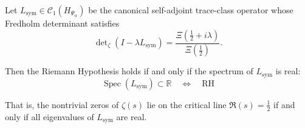 \begin{corollary}
\label{cor:spectrum_real_equiv_rh}
Let \( L_{\mathrm{sym}} \in \mathcal{C}_1(H_{\Psi_\alpha}) \) be the canonical self-adjoint trace-class operator whose Fredholm determinant satisfies
\[
\det\nolimits_\zeta(I - \lambda L_{\mathrm{sym}})
= \frac{\Xi\left(\tfrac{1}{2} + i\lambda\right)}{\Xi\left(\tfrac{1}{2}\right)}.
\]

Then the Riemann Hypothesis holds if and only if the spectrum of \( L_{\mathrm{sym}} \) is real:
\[
\boxed{
\operatorname{Spec}(L_{\mathrm{sym}}) \subset \mathbb{R}
\quad \Longleftrightarrow \quad \mathrm{RH}
}
\]

\noindent
That is, the nontrivial zeros of \( \zeta(s) \) lie on the critical line \( \Re(s) = \tfrac{1}{2} \) if and only if all eigenvalues of \( L_{\mathrm{sym}} \) are real.

\end{corollary}
% 